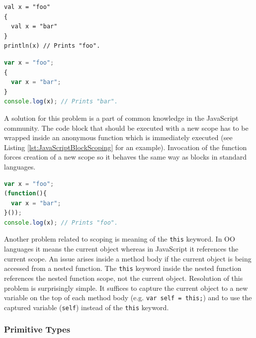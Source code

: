 \documentclass[12pt,a4paper]{report}
\begin{document}
\begin{center}
\begin{minipage}{.48\textwidth}
  \begin{lstlisting}[caption={Scala scoping.},label={lst:ScalaScoping}]
val x = "foo"
{ 
  val x = "bar" 
}
println(x) // Prints "foo".
	\end{lstlisting}
\end{minipage}
\hfill
\begin{minipage}{.48\textwidth}
  \begin{lstlisting}[language=JavaScript,caption={JavaScript scoping.},label={lst:JavaScriptScoping}]
var x = "foo";
{ 
  var x = "bar";
}
console.log(x); // Prints "bar".
  \end{lstlisting}
\end{minipage}
\end{center}

A solution for this problem is a part of common knowledge in the JavaScript community. The code block that should be executed with a new scope has to be wrapped inside an anonymous function which is immediately executed (see Listing \ref{lst:JavaScriptBlockScoping} for an example). Invocation of the function forces creation of a new scope so it behaves the same way as blocks in standard languages.

\begin{minipage}{\linewidth}
\begin{lstlisting}[language=JavaScript,caption={Emulation of block scope in JavaScript.},label={lst:JavaScriptBlockScoping}]
var x = "foo";
(function(){ 
  var x = "bar";
}());
console.log(x); // Prints "foo".
\end{lstlisting}
\end{minipage}

Another problem related to scoping is meaning of the \texttt{this} keyword. In OO languages it means the current object whereas in JavaScript it references the current scope. An issue arises inside a method body if the current object is being accessed from a nested function. The \texttt{this} keyword inside the nested function references the nested function scope, not the current object. Resolution of this problem is surprisingly simple. It suffices to capture the current object to a new variable on the top of each method body (e.g. \texttt{var self = this;}) and to use the captured variable (\texttt{self}) instead of the \texttt{this} keyword.

\subsubsection*{Primitive Types}
\end{document}
